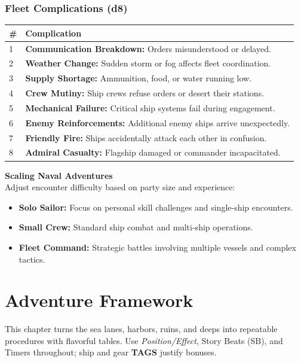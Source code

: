 \documentclass[11pt,oneside]{book}
\begin{document}
\begin{itemize}
\subsection*{Fleet Complications (d8)}
\begin{tabularx}{\linewidth}{@{}p{0.7cm} X@{}}
\toprule
\# & \textbf{Complication}\\
\midrule
1 & \textbf{Communication Breakdown:} Orders misunderstood or delayed.\\
2 & \textbf{Weather Change:} Sudden storm or fog affects fleet coordination.\\
3 & \textbf{Supply Shortage:} Ammunition, food, or water running low.\\
4 & \textbf{Crew Mutiny:} Ship crews refuse orders or desert their stations.\\
5 & \textbf{Mechanical Failure:} Critical ship systems fail during engagement.\\
6 & \textbf{Enemy Reinforcements:} Additional enemy ships arrive unexpectedly.\\
7 & \textbf{Friendly Fire:} Ships accidentally attack each other in confusion.\\
8 & \textbf{Admiral Casualty:} Flagship damaged or commander incapacitated.\\
\bottomrule
\end{tabularx}

\begin{tcolorbox}[breakable]
\textbf{Scaling Naval Adventures}\\
Adjust encounter difficulty based on party size and experience:
\begin{itemize}
  \item \textbf{Solo Sailor:} Focus on personal skill challenges and single-ship encounters.
  \item \textbf{Small Crew:} Standard ship combat and multi-ship operations.
  \item \textbf{Fleet Command:} Strategic battles involving multiple vessels and complex tactics.
\end{itemize}
\end{tcolorbox}

\chapter{Adventure Framework}

\noindent This chapter turns the sea lanes, harbors, ruins, and deeps into repeatable procedures with flavorful tables. Use \emph{Position/Effect}, Story Beats (SB), and Timers throughout; ship and gear \textbf{TAGS} justify bonuses.


\end{itemize}
\end{document}
